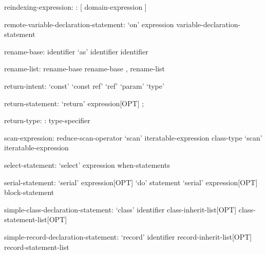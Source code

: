 \begin{syntax}
reindexing-expression:
  : [ domain-expression ]
\end{syntax}

\begin{syntax}
remote-variable-declaration-statement:
  `on' expression variable-declaration-statement
\end{syntax}

\begin{syntax}
rename-base:
  identifier `as' identifier
  identifier
\end{syntax}

\begin{syntax}
rename-list:
  rename-base
  rename-base , rename-list
\end{syntax}

\begin{syntax}
return-intent:
  `const'
  `const ref'
  `ref'
  `param'
  `type'
\end{syntax}

\begin{syntax}
return-statement:
  `return' expression[OPT] ;
\end{syntax}

\begin{syntax}
return-type:
  : type-specifier
\end{syntax}

\begin{syntax}
scan-expression:
  reduce-scan-operator `scan' iteratable-expression
  class-type `scan' iteratable-expression
\end{syntax}

\begin{syntax}
select-statement:
  `select' expression { when-statements }
\end{syntax}

\begin{syntax}
serial-statement:
  `serial' expression[OPT] `do' statement
  `serial' expression[OPT] block-statement
\end{syntax}

\begin{syntax}
simple-class-declaration-statement:
  `class' identifier class-inherit-list[OPT] { class-statement-list[OPT] }
\end{syntax}

\begin{syntax}
simple-record-declaration-statement:
  `record' identifier record-inherit-list[OPT] { record-statement-list }
\end{syntax}

